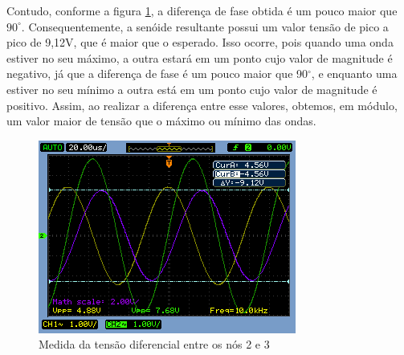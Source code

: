 \documentclass[a4paper]{article} %
\begin{document}
Contudo, conforme a figura \ref{fig:Fig-45}, a diferença de fase obtida é um pouco maior que $90^{\circ}$. Consequentemente, a senóide resultante possui um valor tensão de pico a pico de 9,12V, que é maior que o esperado. %
 Isso ocorre, pois quando uma onda estiver no seu máximo, a outra estará em um ponto cujo valor de magnitude é negativo, já que a diferença de fase é um pouco maior que 90$^{\circ}$, e enquanto uma estiver no seu mínimo a outra está em um ponto cujo valor de magnitude é positivo. Assim, ao realizar a diferença entre esse valores, obtemos, em módulo, um valor maior de tensão que o máximo ou mínimo das ondas.


\begin{figure}[h!]
\begin{centering}
\includegraphics[scale=0.7]{Imagens/45} \caption{Medida da tensão diferencial entre os nós 2 e 3 \label{fig:Fig-45}}
\par\end{centering}
\end{figure}

\end{document}
